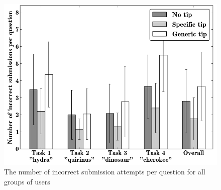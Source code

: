 \documentclass{sig-alternate}
\begin{document}
\begin{figure}[H]
\centering
\includegraphics[scale=0.33]{img/incorrect}
\caption{The number of incorrect submission attempts per question for all groups of users}
\label{figure:incorrect}
\end{figure}
\end{document}
